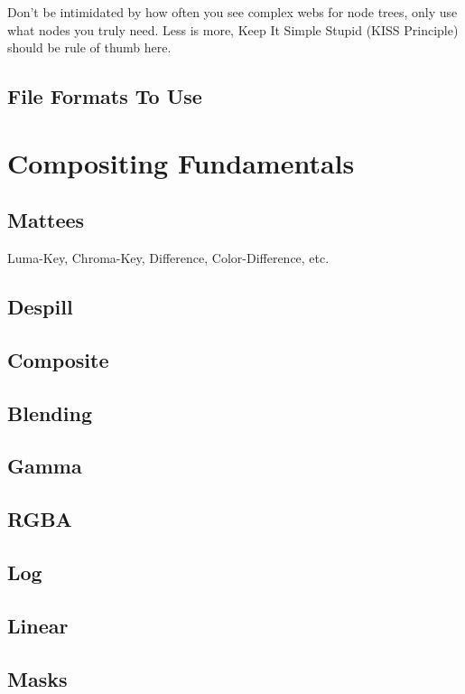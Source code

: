 \documentclass[letterpaper,12pt,oneside]{book}
\begin{document}
Don't be intimidated by how often you see complex webs for node trees, only use what nodes you truly need. Less is more, Keep It Simple Stupid (KISS Principle) should be rule of thumb here.

\section{File Formats To Use}

\chapter{Compositing Fundamentals}

\section{Mattees}
Luma-Key, Chroma-Key, Difference, Color-Difference, etc.

\section{Despill}

\section{Composite}

\section{Blending}

\section{Gamma}

\section{RGBA}

\section{Log}

\section{Linear}

\section{Masks}
\end{document}
